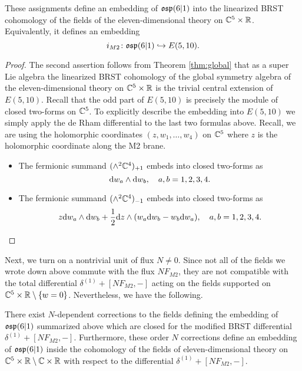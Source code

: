 \begin{lem}\label{lem:m2emb}
These assignments define an embedding of $\mathfrak{osp}(6|1)$ into the linearized BRST cohomology of the fields of the eleven-dimensional theory on $\mathbb C^5 \times \mathbb R$. 
Equivalently, it defines an embedding
\[
i_{M2} \colon \mathfrak{osp}(6|1) \hookrightarrow E(5,10) .
\]
\end{lem} 
\begin{proof}
The second assertion follows from Theorem \ref{thm:global} that as a super Lie algebra the linearized BRST cohomology of the global symmetry algebra of the eleven-dimensional theory on $\mathbb C^5 \times \mathbb R$ is the trivial central extension of $E(5,10)$. 
Recall that the odd part of $E(5,10)$ is precisely the module of closed two-forms on $\mathbb C^5$. 
To explicitly describe the embedding into $E(5,10)$ we simply apply the de Rham differential to the last two formulas above.
Recall, we are using the holomorphic coordinates $(z,w_1,\ldots,w_4)$ on $\mathbb C^5$ where $z$ is the holomorphic coordinate along the M2 brane. 
\begin{itemize}[leftmargin=\parindent]
\item 
The fermionic summand $(\wedge^2 \mathbb C^4)_{+1}$ embeds into closed two-forms as
\[
{\rm d} w_a \wedge {\rm d} w_b, \quad a,b=1,2,3,4. 
\] 
\item The fermionic summand $(\wedge^2 \mathbb C^4)_{-1}$ embeds into closed two-forms as
\[
z {\rm d} w_a  \wedge {\rm d} w_b + \frac12 {\rm d} z \wedge (w_a {\rm d} w_b - w_b {\rm d} w_a) , \quad a,b=1,2,3,4. 
\] 
\end{itemize}
\end{proof}
\parsec[]

Next, we turn on a nontrivial unit of flux $N \ne 0$. 
Since not all of the fields we wrote down above commute with the flux $N F_{M2}$, they are not compatible with the total differential $\delta^{(1)} + [N F_{M2}, -]$ acting on the fields supported on $\mathbb C^5 \times \mathbb R \setminus \{w=0\}$. 
Nevertheless, we have the following. 

\begin{prop}
\label{prop:brads4}
There exist $N$-dependent corrections to the fields defining the embedding of $\mathfrak{osp}(6|1)$ summarized above which are closed for the modified BRST differential $\delta^{(1)} + [N F_{M2},-]$. 
Furthermore, these order $N$ corrections define an embedding of $\mathfrak{osp}(6|1)$ inside the cohomology of the fields of eleven-dimensional theory on $\mathbb C^5 \times \mathbb R \setminus \mathbb C \times \mathbb R$ with respect to the differential $\delta^{(1)} + [N F_{M2},-]$.
\end{prop}

